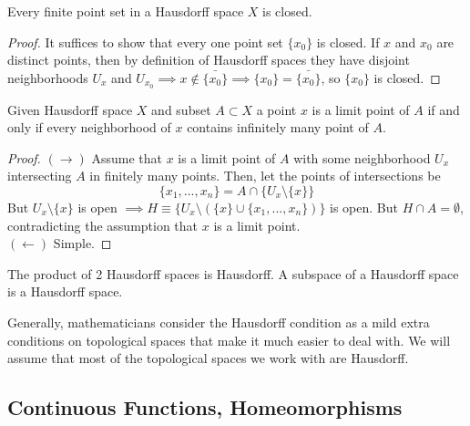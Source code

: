 \documentclass{article}
\begin{document}
    \begin{theorem}
    Every finite point set in a Hausdorff space $X$ is closed. 
    \end{theorem}
    \begin{proof}
    It suffices to show that every one point set $\{x_0\}$ is closed. If $x$ and $x_0$ are distinct points, then by definition of Hausdorff spaces they have disjoint neighborhoods $U_x$ and $U_{x_0} \implies x \not\in \bar{\{x_0\}} \implies \{x_0\} = \bar{\{x_0\}}$, so $\{x_0\}$ is closed. 
    \end{proof}

    \begin{theorem}
    Given Hausdorff space $X$ and subset $A \subset X$ a point $x$ is a limit point of $A$ if and only if every neighborhood of $x$ contains infinitely many point of $A$. 
    \end{theorem}
    \begin{proof}
    $(\rightarrow)$ Assume that $x$ is a limit point of $A$ with some neighborhood $U_x$ intersecting $A$ in finitely many points. Then, let the points of intersections be 
    \[\{x_1, ..., x_n\} = A \cap \{U_x \setminus \{x\} \} \]
    But $U_x \setminus \{x\}$ is open $\implies H \equiv \{U_x \setminus ( \{x\} \cup \{x_1, ..., x_n\})\}$ is open. But $H \cap A = \emptyset$, contradicting the assumption that $x$ is a limit point. \\
    $(\leftarrow)$ Simple. 
    \end{proof}

    \begin{theorem}
    The product of 2 Hausdorff spaces is Hausdorff. A subspace of a Hausdorff space is a Hausdorff space. 
    \end{theorem}

    Generally, mathematicians consider the Hausdorff condition as a mild extra conditions on topological spaces that make it much easier to deal with. We will assume that most of the topological spaces we work with are Hausdorff. 

  \subsection{Continuous Functions, Homeomorphisms}
\end{document}
